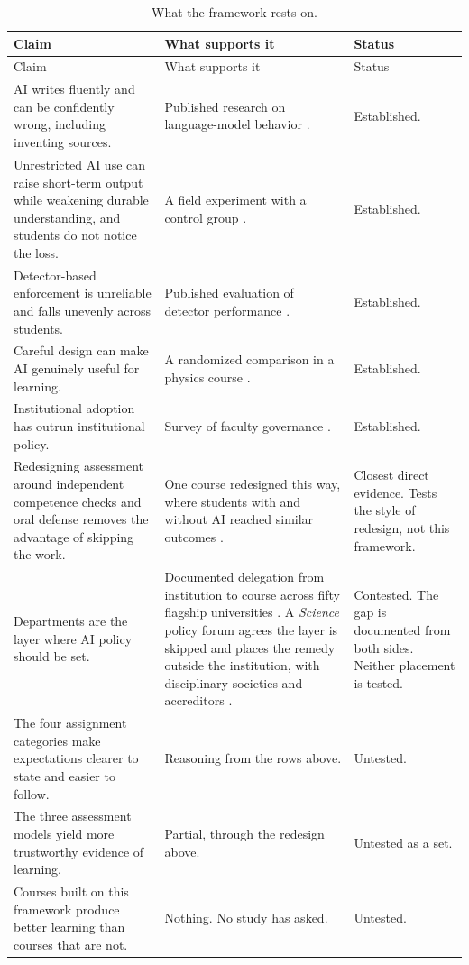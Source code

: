 \documentclass{SIAMbook2023}
\begin{document}
\begin{longtable}{>{\raggedright\arraybackslash}p{}>{\raggedright\arraybackslash}p{}>{\raggedright\arraybackslash}p{}}
  \caption{What the framework rests on.}\label{u:tab:evidence-status}\\
  \toprule
  Claim & What supports it & Status \\
  \midrule
  \endfirsthead
  \toprule
  Claim & What supports it & Status \\
  \midrule
  \endhead
  AI writes fluently and can be confidently wrong, including inventing sources. & Published research on language-model behavior \citep{bender2021dangers,walters2023fabrication}. & Established. \\
  Unrestricted AI use can raise short-term output while weakening durable understanding, and students do not notice the loss. & A field experiment with a control group \citep{bastani2025generative}. & Established. \\
  Detector-based enforcement is unreliable and falls unevenly across students. & Published evaluation of detector performance \citep{liang2023gpt}. & Established. \\
  Careful design can make AI genuinely useful for learning. & A randomized comparison in a physics course \citep{kestin2025ai}. & Established. \\
  Institutional adoption has outrun institutional policy. & Survey of faculty governance \citep{aaup2025artificial}. & Established. \\
  Redesigning assessment around independent competence checks and oral defense removes the advantage of skipping the work. & One course redesigned this way, where students with and without AI reached similar outcomes \citep{kosar2024computer}. & Closest direct evidence. Tests the style of redesign, not this framework. \\
  Departments are the layer where AI policy should be set. & Documented delegation from institution to course across fifty flagship universities \citep{lafrance2026governing}. A \emph{Science} policy forum agrees the layer is skipped and places the remedy outside the institution, with disciplinary societies and accreditors \citep{chirikov2026generative}. & Contested. The gap is documented from both sides. Neither placement is tested. \\
  The four assignment categories make expectations clearer to state and easier to follow. & Reasoning from the rows above. & Untested. \\
  The three assessment models yield more trustworthy evidence of learning. & Partial, through the redesign above. & Untested as a set. \\
  Courses built on this framework produce better learning than courses that are not. & Nothing. No study has asked. & Untested. \\
  \bottomrule
\end{longtable}
\end{document}
